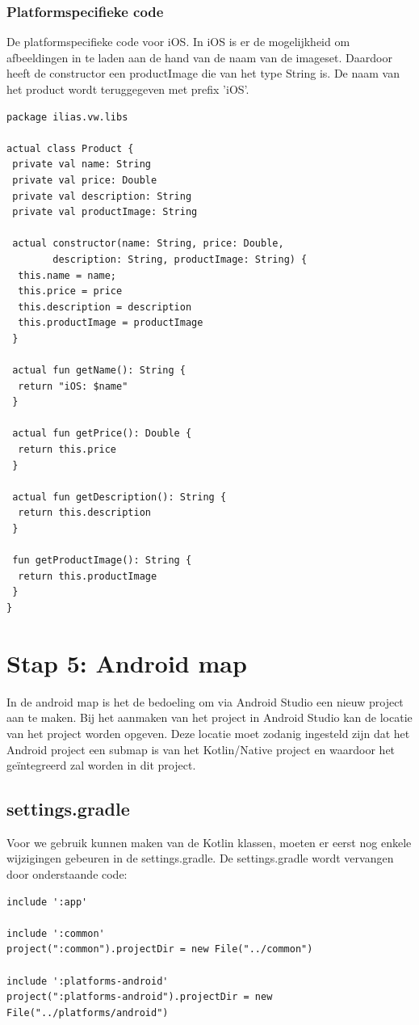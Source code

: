 \subsubsection{Platformspecifieke code}
De platformspecifieke code voor iOS. In iOS is er de mogelijkheid om afbeeldingen in te laden aan de hand van de naam van de imageset. Daardoor heeft de constructor een productImage die van het type String is. De naam van het product wordt teruggegeven met prefix 'iOS'.
\begin{lstlisting}
package ilias.vw.libs

actual class Product {
 private val name: String
 private val price: Double
 private val description: String
 private val productImage: String

 actual constructor(name: String, price: Double, 
		description: String, productImage: String) {
  this.name = name;
  this.price = price
  this.description = description
  this.productImage = productImage
 }

 actual fun getName(): String {
  return "iOS: $name"
 }

 actual fun getPrice(): Double {
  return this.price
 }

 actual fun getDescription(): String {
  return this.description
 }

 fun getProductImage(): String {
  return this.productImage
 }
}
\end{lstlisting}

\section{Stap 5: Android map}
In de android map is het de bedoeling om via Android Studio een nieuw project aan te maken. Bij het aanmaken van het project in Android Studio kan de locatie van het project worden opgeven. Deze locatie moet zodanig ingesteld zijn dat het Android project een submap is van het Kotlin/Native project en waardoor het geïntegreerd zal worden in dit project.

\subsection{settings.gradle}
Voor we gebruik kunnen maken van de Kotlin klassen, moeten er eerst nog enkele wijzigingen gebeuren in de settings.gradle. De settings.gradle wordt vervangen door onderstaande code:

\begin{lstlisting}
include ':app'

include ':common'
project(":common").projectDir = new File("../common")

include ':platforms-android'
project(":platforms-android").projectDir = new File("../platforms/android")
\end{lstlisting}

